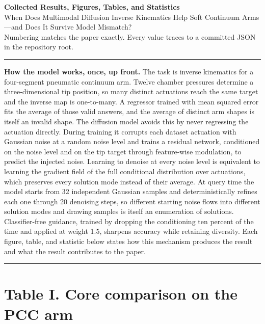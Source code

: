 \documentclass[11pt]{article}
\begin{document}
\begin{center}
{\LARGE\bfseries Collected Results, Figures, Tables, and Statistics}\\[4pt]
{\large When Does Multimodal Diffusion Inverse Kinematics Help Soft Continuum
Arms---and Does It Survive Model Mismatch?}\\[4pt]
{\small Numbering matches the paper exactly. Every value traces to a committed
JSON in the repository root.}
\end{center}

\vspace{6pt}
\hrule
\vspace{10pt}

{\bf How the model works, once, up front.} The task is inverse kinematics for
a four-segment pneumatic continuum arm. Twelve chamber pressures determine a
three-dimensional tip position, so many distinct actuations reach the same
target and the inverse map is one-to-many. A regressor trained with mean
squared error fits the average of those valid answers, and the average of
distinct arm shapes is itself an invalid shape. The diffusion model avoids
this by never regressing the actuation directly. During training it corrupts
each dataset actuation with Gaussian noise at a random noise level and trains
a residual network, conditioned on the noise level and on the tip target
through feature-wise modulation, to predict the injected noise. Learning to
denoise at every noise level is equivalent to learning the gradient field of
the full conditional distribution over actuations, which preserves every
solution mode instead of their average. At query time the model starts from
32 independent Gaussian samples and deterministically refines each one
through 20 denoising steps, so different starting noise flows into different
solution modes and drawing samples is itself an enumeration of solutions.
Classifier-free guidance, trained by dropping the conditioning ten percent of
the time and applied at weight 1.5, sharpens accuracy while retaining
diversity. Each figure, table, and statistic below states how this mechanism
produces the result and what the result contributes to the paper.

\vspace{10pt}
\hrule

\section*{Table I. Core comparison on the PCC arm}
\end{document}
